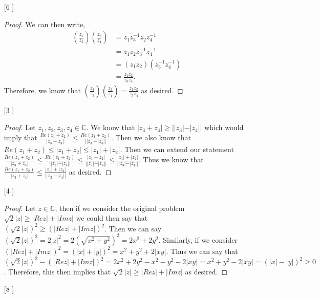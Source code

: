 \documentclass{article}
\theoremstyle{definition}
\newcommand{\C}{\mathbb{C}}
\begin{document}
\begin{enumerate}
    \item [[\phantom{-}6]]
    
    \begin{proof}
    We can then write,
    \begin{align*}
        (\frac{z_1}{z_3})(\frac{z_2}{z_4}) &= z_1z_3^{-1}z_2z_4^{-1}\\
        &= z_1z_2z_3^{-1}z_4^{-1}\\
        &= (z_1z_2)(z_3^{-1}z_4^{-1})\\
        &= \frac{z_1z_2}{z_3z_4}.
    \end{align*}
    Therefore, we know that $(\frac{z_1}{z_3})(\frac{z_2}{z_4}) = \frac{z_1z_2}{z_3z_4}$ as desired.
    \end{proof}
    
    \item [[\phantom{-}3]]
    
    \begin{proof}
    Let $z_1, z_2, z_3, z_4 \in \C$. We know that $|z_3 + z_4| \geq ||z_3| - |z_4||$ which would imply that $\frac{Re(z_1 + z_2)}{|z_3 + z_4|} \leq \frac{Re(z_1 + z_2)}{||z_3| - |z_4||}$. Then we also know that $Re(z_1 + z_2) \leq |z_1 + z_2| \leq |z_1| + |z_2|$. Then we can extend our statement $\frac{Re(z_1 + z_2)}{|z_3 + z_4|} \leq \frac{Re(z_1 + z_2)}{||z_3| - |z_4||} \leq \frac{|z_1 + z_2|}{||z_3| - |z_4||} \leq \frac{|z_1| + |z_2|}{||z_3| - |z_4||}$. Thus we know that $\frac{Re(z_1 + z_2)}{|z_3 + z_4|} \leq \frac{|z_1| + |z_2|}{||z_3| - |z_4||}$ as desired.
    \end{proof}
    
    \item [[\phantom{-}4]]
    
    \begin{proof}
    Let $z\in \C$, then if we consider the original problem $\sqrt{2}|z| \geq |Re z| + |Im z|$ we could then say that $(\sqrt{2}|z|)^2 \geq (|Re z| + |Im z|)^2$. Then we can say $(\sqrt{2}|z|)^2 = 2|z|^2 = 2(\sqrt{x^2 + y^2})^2 = 2x^2 + 2y^2.$ Similarly, if we consider $(|Rez| + |Imz|)^2 = (|x| + |y|)^2 = x^2 + y^2 + 2|xy|$. Thus we can say that $(\sqrt{2}|z|)^2 - (|Re z| + |Im z|)^2 = 2x^2 + 2y^2 - x^2 - y^2 - 2|xy| = x^2 + y^2 - 2|xy| = (|x| - |y|)^2 \geq 0$. Therefore, this then implies that $\sqrt{2}|z| \geq |Re z| + |Im z|$ as desired.
    \end{proof}
    
    \item [[\phantom{-}8]]
    

\end{enumerate}
\end{document}
